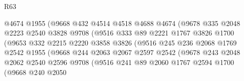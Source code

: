 \begin{lexlean}{R63}
\begin{coremodule}
                              @4674
                              @1955
                              (@9668
                                @432
                                @4514
                                @4518
                                @4688
                                @4674
                                (@9678
                                  @335
                                  @2048
                                  @2223
                                  @2540
                                  @3828
                                  @9708
                                  (@9516
                                    @333
                                    @89
                                    @2221
                                    @1767
                                    @3826
                                    @1700
                                    (@9653
                                      @332
                                      @2215
                                      @2220
                                      @3858
                                      @3826
                                      (@9516
                                        @245
                                        @236
                                        @2068
                                        @1769
                                        @2542
                                        @1955
                                        (@9668
                                          @244
                                          @2063
                                          @2067
                                          @2597
                                          @2542
                                          (@9678
                                            @243
                                            @2048
                                            @2062
                                            @2540
                                            @2596
                                            @9708
                                            (@9516
                                              @241
                                              @89
                                              @2060
                                              @1767
                                              @2594
                                              @1700
                                              (@9668
                                                @240
                                                @2050

\end{coremodule}
\end{lexlean}
